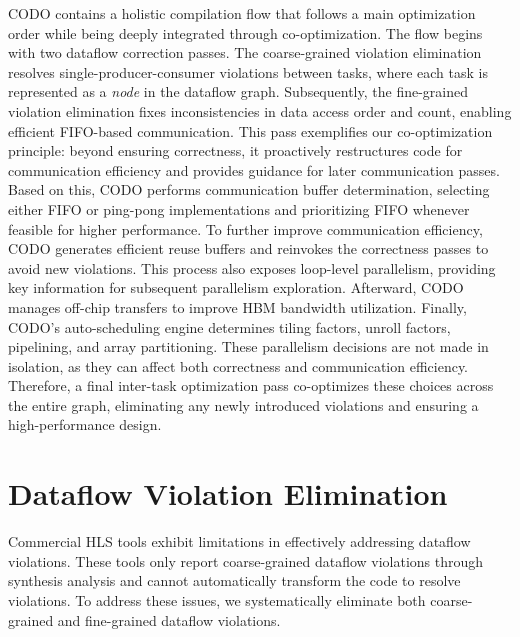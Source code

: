 \documentclass[conference]{IEEEtran}
\begin{document}
CODO contains a holistic compilation flow that follows a main optimization order while being deeply integrated through co-optimization.
The flow begins with two dataflow correction passes. The coarse-grained violation elimination resolves single-producer-consumer violations between tasks, where each task is represented as a \textit{node} in the dataflow graph. Subsequently, the fine-grained violation elimination fixes inconsistencies in data access order and count, enabling efficient FIFO-based communication.
This pass exemplifies our co-optimization principle: beyond ensuring correctness, it proactively restructures code for communication efficiency and provides guidance for later communication passes.
Based on this, CODO performs communication buffer determination, selecting either FIFO or ping-pong implementations and prioritizing FIFO whenever feasible for higher performance.
To further improve communication efficiency, CODO generates efficient reuse buffers and reinvokes the correctness passes to avoid new violations. This process also exposes loop-level parallelism, providing key information for subsequent parallelism exploration.
Afterward, CODO manages off-chip transfers to improve HBM bandwidth utilization. 
Finally, CODO's auto-scheduling engine determines tiling factors, unroll factors, pipelining, and array partitioning. These parallelism decisions are not made in isolation, as they can affect both correctness and communication efficiency. Therefore, a final inter-task optimization pass co-optimizes these choices across the entire graph, eliminating any newly introduced violations and ensuring a high-performance design. 





\section{Dataflow Violation Elimination}
Commercial HLS tools \cite{vitishls,intelhls} exhibit limitations in effectively addressing dataflow violations. These tools only report coarse-grained dataflow violations through synthesis analysis and cannot automatically transform the code to resolve violations. To address these issues, we systematically eliminate both coarse-grained and fine-grained dataflow violations.
 \vspace{-0.1cm}
\end{document}
